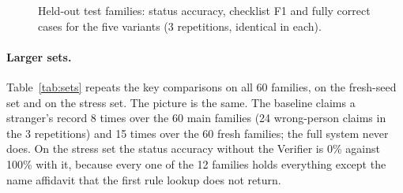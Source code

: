 \documentclass[12pt,a4paper,oneside]{report}
\begin{document}
\begin{figure}[t]
\centering
{}
\caption[Status accuracy, F1 and fully correct cases (test families)]{Held-out test families: status accuracy, checklist F1 and fully correct cases for the five variants (3 repetitions, identical in each).}
\label{fig:bars}
\end{figure}

\paragraph{Larger sets.} Table~\ref{tab:sets} repeats the key comparisons on all 60 families, on the fresh-seed set and on the stress set. The picture is the same. The baseline claims a stranger's record 8 times over the 60 main families (24 wrong-person claims in the 3 repetitions) and 15 times over the 60 fresh families; the full system never does. On the stress set the status accuracy without the Verifier is 0\% against 100\% with it, because every one of the 12 families holds everything except the name affidavit that the first rule lookup does not return.
\end{document}
